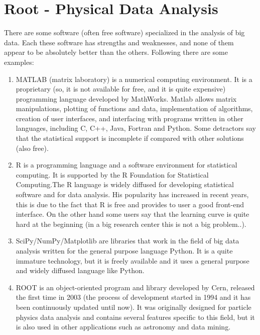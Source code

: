 \section{Root - Physical Data Analysis }

There are some software (often free software) specialized in the analysis of big data. Each these software has strengths and weaknesses, and none of them appear to be absolutely better than the others. Following there are some examples:
 
\begin{enumerate}

\item MATLAB (matrix laboratory) is a numerical computing environment. It is a proprietary (so, it is not available for free, and it is quite expensive) programming language developed by MathWorks. Matlab allows matrix manipulations, plotting of functions and data, implementation of algorithms, creation of user interfaces, and interfacing with programs written in other languages, including C, C++, Java, Fortran and Python. 
Some detractors say that the statistical support is incomplete if compared with other solutions (also free).

\item R is a programming language and a software environment for statistical computing. It is supported by the R Foundation for Statistical Computing.The R language is widely diffused for developing statistical software and for data analysis. His popularity has increased in recent years, this is due to the fact that R is free and provides to user a good front-end interface. On the other hand some users say that the learning curve is quite hard at the beginning (in a big research center this is not a big problem..).  

\item SciPy/NumPy/Matplotlib are libraries that work in the field of big data analysis written for the general purpose language Python. It is a quite immature technology, but it is freely available and it uses a general purpose and widely diffused language like Python.

\item ROOT is an object-oriented program and library developed by Cern, released the first time in 2003 (the process of development started in 1994 and it has been continuously updated until now). It was originally designed for particle physics data analysis and contains several features specific to this field, but it is also used in other applications such as astronomy and data mining. 

\end{enumerate}

